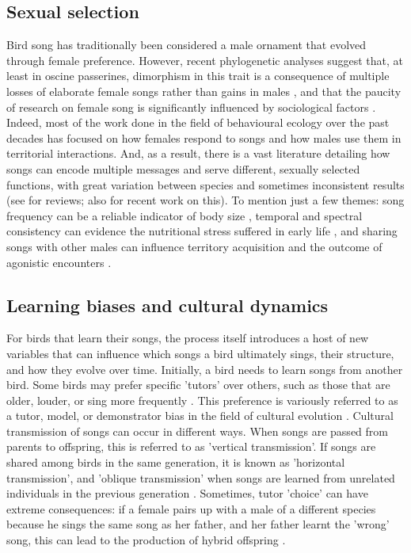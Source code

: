 \subsection{Sexual selection}
Bird song has traditionally been considered a male ornament that evolved through female preference. However, recent phylogenetic analyses suggest that, at least in oscine passerines, dimorphism in this trait is a consequence of multiple losses of elaborate female songs rather than gains in males \autocite{odom2014,odom2018}, and that the paucity of research on female song is significantly influenced by sociological factors \autocite{haines2020}. Indeed, most of the work done in the field of behavioural ecology over the past decades has focused on how females respond to songs and how males use them in territorial interactions. And, as a result, there is a vast literature detailing how songs can encode multiple messages and serve different, sexually selected functions, with great variation between species and sometimes inconsistent results (see \cite{catchpole2008} for reviews; also \cite{sierro2023} for recent work on this). To mention just a few themes: song frequency can be a reliable indicator of body size \autocite{ryan1985}, temporal and spectral consistency can evidence the nutritional stress suffered in early life \autocite{macdonald2006}, and sharing songs with other males can influence territory acquisition and the outcome of agonistic encounters \autocite{Demko2016a,krebs1978}.

\subsection{Learning biases and cultural dynamics}
For birds that learn their songs, the process itself introduces a host of new variables that can influence which songs a bird ultimately sings, their structure, and how they evolve over time. Initially, a bird needs to learn songs from another bird. Some birds may prefer specific 'tutors' over others, such as those that are older, louder, or sing more frequently \autocite{Greig2012}. This preference is variously referred to as a tutor, model, or demonstrator bias in the field of cultural evolution \autocite{kendal2015,VanDeWaal2010}. Cultural transmission of songs can occur in different ways. When songs are passed from parents to offspring, this is referred to as 'vertical transmission'. If songs are shared among birds in the same generation, it is known as 'horizontal transmission', and 'oblique transmission' when songs are learned from unrelated individuals in the previous generation \autocite{cavalli-sforza1982,ram2018}. Sometimes, tutor 'choice’ can have extreme consequences: if a female pairs up with a male of a different species because he sings the same song as her father, and her father learnt the 'wrong’ song, this can lead to the production of hybrid offspring \autocite{grant1997,grant1997a}.

